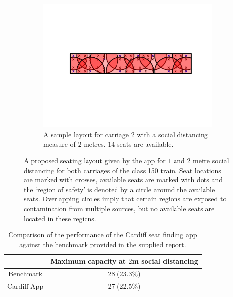 \documentclass[11pt,a4paper]{article}
\begin{document}
\begin{itemize}
\begin{figure}[ht!]
\begin{subfigure}[h]{0.490\linewidth}
\includegraphics[width = \linewidth]{class150_second_car_2m.png}
\caption{A sample layout for carriage 2 with a social distancing measure of $2$ metres. $14$ seats are available.}
\label{TwoMetre2}
\end{subfigure}
\caption{A proposed seating layout given by the app for $1$ and $2$ metre social distancing for both carriages of the class 150 train. Seat locations are marked with crosses, available seats are marked with dots and the `region of safety' is denoted by a circle around the available seats. Overlapping circles imply that certain regions are exposed to contamination from multiple sources, but no available seats are located in these regions. }
\label{Demonstration_pics}
\end{figure}


\begin{table}[ht!]
\begin{center}
 \begin{tabular}{|c |c|}
 \hline
& \textbf{Maximum capacity at $2$m social distancing }\\
 \hline

 Benchmark &   28 (23.3\%)\footnotemark \\
 \hline
 Cardiff App  & 27 (22.5\%)\\

\hline
\end{tabular}
\end{center}
\caption{Comparison of the performance of the Cardiff seat finding app against the benchmark provided in the supplied report.}
\label{tab:performance}
\end{table}




\end{itemize}
\end{document}
